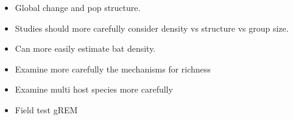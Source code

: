 




\begin{itemize}
\item Global change and pop structure.
\item Studies should more carefully consider density vs structure vs group size.
\item Can more easily estimate bat density.

\end{itemize}






\begin{itemize}
\item Examine more carefully the mechanisms for richness
\item Examine multi host species more carefully
\item Field test gREM
\end{itemize}


